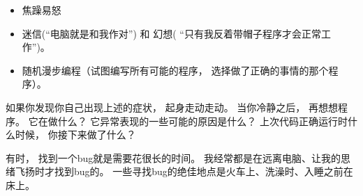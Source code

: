 \begin{itemize}


\item 焦躁易怒


\item 迷信(``电脑就是和我作对'') 和 幻想( ``只有我反着带帽子程序才会正常工作'')。


\item 随机漫步编程（试图编写所有可能的程序， 选择做了正确的事情的那个程序）。

\end{itemize}


如果你发现你自己出现上述的症状， 起身走动走动。
当你冷静之后， 再想想程序。  它在做什么？
它异常表现的一些可能的原因是什么？
上次代码正确运行时什么时候， 你接下来做了什么？


有时， 找到一个bug就是需要花很长的时间。
我经常都是在远离电脑、让我的思绪飞扬时才找到bug的。
一些寻找bug的绝佳地点是火车上、洗澡时、入睡之前在床上。


